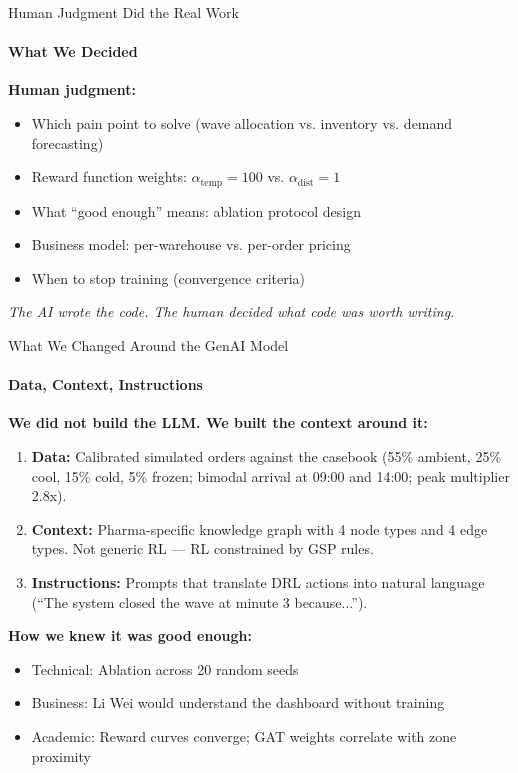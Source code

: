 \documentclass{beamer}
\begin{document}
\begin{frame}{Human Judgment Did the Real Work}
  \framesubtitle{What We Decided}
  \small

  \textbf{\color{deepred}Human judgment:}
  \begin{itemize}
    \item Which pain point to solve (wave allocation vs. inventory vs. demand forecasting)
    \item Reward function weights: $\alpha_{\text{temp}} = 100$ vs. $\alpha_{\text{dist}} = 1$
    \item What ``good enough'' means: ablation protocol design
    \item Business model: per-warehouse vs. per-order pricing
    \item When to stop training (convergence criteria)
  \end{itemize}

  \vspace{0.3cm}
  \centering
  \textit{The AI wrote the code. The human decided what code was worth writing.}
\end{frame}

\begin{frame}{What We Changed Around the GenAI Model}
  \framesubtitle{Data, Context, Instructions}
  \small

  \textbf{We did not build the LLM. We built the context around it:}

  \vspace{0.15cm}
  \begin{enumerate}
    \item \textbf{Data:} Calibrated simulated orders against the casebook (55\% ambient, 25\% cool, 15\% cold, 5\% frozen; bimodal arrival at 09:00 and 14:00; peak multiplier 2.8x).
    \item \textbf{Context:} Pharma-specific knowledge graph with 4 node types and 4 edge types. Not generic RL --- RL constrained by GSP rules.
    \item \textbf{Instructions:} Prompts that translate DRL actions into natural language (``The system closed the wave at minute 3 because...'').
  \end{enumerate}

  \vspace{0.2cm}
  \textbf{How we knew it was good enough:}
  \begin{itemize}
    \item Technical: Ablation across 20 random seeds
    \item Business: Li Wei would understand the dashboard without training
    \item Academic: Reward curves converge; GAT weights correlate with zone proximity
  \end{itemize}
\end{frame}
\end{document}
